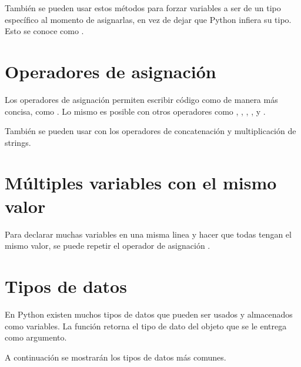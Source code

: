 
También se pueden usar estos métodos para forzar variables a ser de un tipo específico al momento de asignarlas, en vez de dejar que Python infiera su tipo.
Esto se conoce como .


\section{Operadores de asignación}

Los operadores de asignación permiten escribir código como  de manera más concisa, como .
Lo mismo es posible con otros operadores como \ttt{-}, \ttt{*}, \ttt{/}, \ttt{//}, \ttt{\%} y \ttt{**}.


También se pueden usar con los operadores de concatenación y multiplicación de strings.


\section{Múltiples variables con el mismo valor}

Para declarar muchas variables en una misma linea y hacer que todas tengan el mismo valor, se puede repetir el operador de asignación \ttt{=}.


\section{Tipos de datos}

En Python existen muchos tipos de datos que pueden ser usados y almacenados como variables.
La función  retorna el tipo de dato del objeto que se le entrega como argumento.

A continuación se mostrarán los tipos de datos más comunes.

